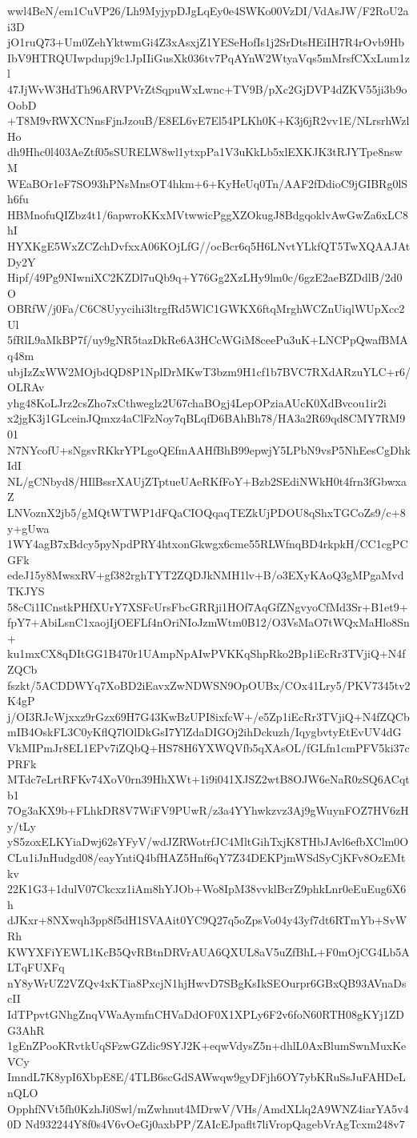 wwl4BeN/em1CuVP26/Lh9MyjypDJgLqEy0e4SWKo00VzDI/VdAsJW/F2RoU2ai3D
jO1ruQ73+Um0ZehYktwmGi4Z3xAsxjZ1YESeHofIs1j2SrDtsHEiIH7R4rOvb9Hb
IbV9HTRQUIwpdupj9c1JpIIiGusXk036tv7PqAYnW2WtyaVqs5mMrsfCXxLum1zl
47JjWvW3HdTh96ARVPVrZtSqpuWxLwnc+TV9B/pXc2GjDVP4dZKV55ji3b9oOobD
+T8M9vRWXCNnsFjnJzouB/E8EL6vE7El54PLKh0K+K3j6jR2vv1E/NLrsrhWzlHo
dh9Hhc0l403AeZtf05sSURELW8wl1ytxpPa1V3uKkLb5xlEXKJK3tRJYTpe8nswM
WEaBOr1eF7SO93hPNsMnsOT4hkm+6+KyHeUq0Tn/AAF2fDdioC9jGIBRg0lSh6fu
HBMnofuQIZbz4t1/6apwroKKxMVtwwicPggXZOkugJ8BdgqoklvAwGwZa6xLC8hI
HYXKgE5WxZCZchDvfxxA06KOjLfG//ocBcr6q5H6LNvtYLkfQT5TwXQAAJAtDy2Y
Hipf/49Pg9NIwniXC2KZDl7uQb9q+Y76Gg2XzLHy9lm0c/6gzE2aeBZDdlB/2d0O
OBRfW/j0Fa/C6C8Uyycihi3ltrgfRd5WlC1GWKX6ftqMrghWCZnUiqlWUpXcc2Ul
5fRlL9aMkBP7f/uy9gNR5tazDkRe6A3HCcWGiM8ceePu3uK+LNCPpQwafBMAq48m
ubjIzZxWW2MOjbdQD8P1NplDrMKwT3bzm9H1cf1b7BVC7RXdARzuYLC+r6/OLRAv
yhg48KoLJrz2csZho7xCthweglz2U67chaBOgj4LepOPziaAUcK0XdBvcou1ir2i
x2jgK3j1GLceinJQmxz4aClFzNoy7qBLqfD6BAhBh78/HA3a2R69qd8CMY7RM901
N7NYcofU+sNgsvRKkrYPLgoQEfmAAHfBhB99epwjY5LPbN9vsP5NhEesCgDhkIdI
NL/gCNbyd8/HIlBssrXAUjZTptueUAeRKfFoY+Bzb2SEdiNWkH0t4frn3fGbwxaZ
LNVoznX2jb5/gMQtWTWP1dFQaCIOQqaqTEZkUjPDOU8qShxTGCoZs9/c+8y+gUwa
1WY4agB7xBdcy5pyNpdPRY4htxonGkwgx6cme55RLWfnqBD4rkpkH/CC1cgPCGFk
edeJ15y8MwsxRV+gf382rghTYT2ZQDJkNMH1lv+B/o3EXyKAoQ3gMPgaMvdTKJYS
58cCi1ICnstkPHfXUrY7XSFcUrsFbcGRRji1HOf7AqGfZNgvyoCfMd3Sr+B1et9+
fpY7+AbiLsnC1xaojIjOEFLf4nOriNIoJzmWtm0B12/O3VsMaO7tWQxMaHlo8Sn+
ku1mxCX8qDItGG1B470r1UAmpNpAIwPVKKqShpRko2Bp1iEcRr3TVjiQ+N4fZQCb
fszkt/5ACDDWYq7XoBD2iEavxZwNDWSN9OpOUBx/COx41Lry5/PKV7345tv2K4gP
j/OI3RJcWjxxz9rGzx69H7G43KwBzUPI8ixfcW+/e5Zp1iEcRr3TVjiQ+N4fZQCb
mIB4OskFL3C0yKflQ7lOlDkGsI7YlZdaDIGOj2ihDckuzh/IqygbvtyEtEvUV4dG
VkMIPmJr8EL1EPv7iZQbQ+HS78H6YXWQVfb5qXAsOL/fGLfn1cmPFV5ki37cPRFk
MTdc7eLrtRFKv74XoV0rn39HhXWt+1i9i041XJSZ2wtB8OJW6eNaR0zSQ6ACqtb1
7Og3aKX9b+FLhkDR8V7WiFV9PUwR/z3a4YYhwkzvz3Aj9gWuynFOZ7HV6zHy/tLy
yS5zoxELKYiaDwj62sYFyV/wdJZRWotrfJC4MltGihTxjK8THbJAvl6efbXClm0O
CLu1iJnHudgd08/eayYntiQ4bfHAZ5Hnf6qY7Z34DEKPjmWSdSyCjKFv8OzEMtkv
22K1G3+1dulV07Ckcxz1iAm8hYJOb+Wo8IpM38vvklBcrZ9phkLnr0eEuEug6X6h
dJKxr+8NXwqh3pp8f5dH1SVAAit0YC9Q27q5oZpsVo04y43yf7dt6RTmYb+SvWRh
KWYXFiYEWL1KcB5QvRBtnDRVrAUA6QXUL8aV5uZfBhL+F0mOjCG4Lb5ALTqFUXFq
nY8yWrUZ2VZQv4xKTia8PxcjN1hjHwvD7SBgKsIkSEOurpr6GBxQB93AVnaDscII
IdTPpvtGNhgZnqVWaAymfnCHVaDdOF0X1XPLy6F2v6foN60RTH08gKYj1ZDG3AhR
1gEnZPooKRvtkUqSFzwGZdic9SYJ2K+eqwVdysZ5n+dhlL0AxBlumSwnMuxKeVCy
ImndL7K8ypI6XbpE8E/4TLB6scGdSAWwqw9gyDFjh6OY7ybKRuSsJuFAHDeLnQLO
OpphfNVt5fh0KzhJi0Swl/mZwhnut4MDrwV/VHs/AmdXLlq2A9WNZ4iarYA5v40D
Nd932244Y8f0s4V6vOeGj0axbPP/ZAIcEJpaflt7liVropQagebVrAgTcxm248v7
